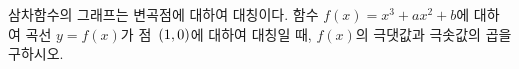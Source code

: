 삼차함수의 그래프는 변곡점에 대하여 대칭이다. 함수 $f(x)=x^3+ax^2+b$에 대하여 곡선 $y=f(x)$가 점~$(1{,}\mkern3mu\mathopen{}0)$에 대하여 대칭일 때, $f(x)$의 극댓값과 극솟값의 곱을 구하시오. 
